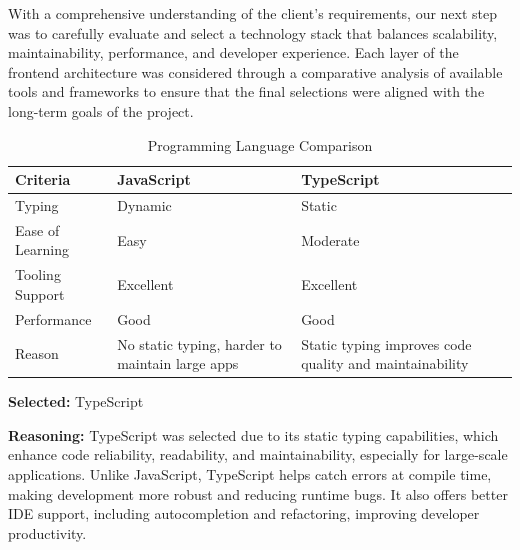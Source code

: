 With a comprehensive understanding of the client's requirements, our next step was to carefully evaluate and select a technology stack that balances scalability, maintainability, performance, and developer experience. Each layer of the frontend architecture was considered through a comparative analysis of available tools and frameworks to ensure that the final selections were aligned with the long-term goals of the project.

\begin{table}[H]
\centering
\caption{Programming Language Comparison}
\begin{tabular}{|l|p{6cm}|p{6cm}|}
\hline
\textbf{Criteria}       & \textbf{JavaScript} & \textbf{TypeScript} \\
\hline
Typing                  & Dynamic             & Static             \\
Ease of Learning        & Easy                & Moderate           \\
Tooling Support        & Excellent           & Excellent          \\
Performance            & Good                & Good               \\
Reason                 & No static typing, harder to maintain large apps & Static typing improves code quality and maintainability \\
\hline
\end{tabular}
\label{tab:programming-language-comparison}
\end{table}

\textbf{Selected:} TypeScript \par
\textbf{Reasoning:} TypeScript was selected due to its static typing capabilities, which enhance code reliability, readability, and maintainability, especially for large-scale applications. Unlike JavaScript, TypeScript helps catch errors at compile time, making development more robust and reducing runtime bugs. It also offers better IDE support, including autocompletion and refactoring, improving developer productivity.

\vspace{2em}


